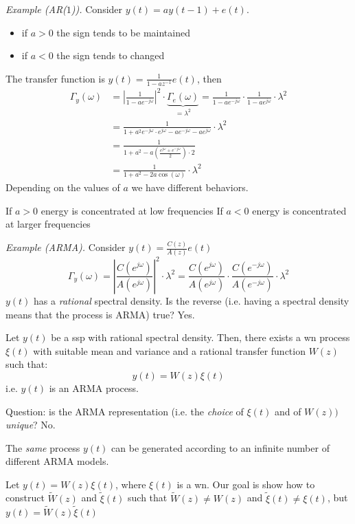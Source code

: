 \emph{Example (AR($1$)).}
Consider $y(t)=ay(t-1)+e(t)$.
\begin{itemize}
	\item if $a>0$ the sign tends to be maintained
	\item if $a<0$ the sign tends to changed
\end{itemize}
The transfer function is $y(t)=\frac{1}{1-az^{-1} }e(t)$, then
\begin{align*}
	\Gamma _{y}(\omega )&=\left|\frac{1}{1-ae^{-j\omega } }\right|^2 \cdot\underbrace{\Gamma _{e}(\omega )}_{=\lambda^2 } = \frac{1}{1-ae^{-j\omega}}\cdot\frac{1}{1-ae^{j\omega}} \cdot\lambda^2\\
	&=\frac{1}{1+a^2 e^{-j\omega }\cdot e^{j\omega }-ae^{-j\omega}-ae^{j\omega}} \cdot \lambda^2\\
	&=\frac{1}{1+a^2 -a\left( \frac{e^{j\omega}+e^{-j\omega}}{2} \right)\cdot 2}\\
	&=\frac{1}{1+a^2-2a\cos (\omega)} \cdot\lambda^2
\end{align*}
Depending on the values of $a$ we have different behaviors.

If $a>0$ energy is concentrated at low frequencies
If $a<0$ energy is concentrated at larger frequencies

\emph{Example (ARMA).}
Consider $y(t)=\frac{C(z)}{A(z)}e(t)$
\[
	\Gamma _{y}(\omega )=\left|\frac{C(e^{j\omega})}{A(e^{j\omega})}\right|^2 \cdot\lambda^2 =\frac{C(e^{j\omega})}{A(e^{j\omega} )} \cdot \frac{C(e^{-j\omega})}{A(e^{-j\omega} )}\cdot\lambda^2 
\]
$y(t)$ has a \emph{rational} spectral density. Is the reverse (i.e. having a spectral density means that the process is ARMA) true? Yes.

\begin{theorem}
	Let $y(t)$ be a \gls{ssp} with rational spectral density.
	Then, there exists a \gls{wn} process $\xi(t)$ with suitable mean and variance and a rational transfer function $W(z)$ such that:
	\[
		y(t)=W(z)\xi(t)
	\]
	i.e. $y(t)$ is an ARMA process.
\end{theorem}

Question: is the ARMA representation (i.e. the \emph{choice} of $\xi(t)$ and of $W(z))$ \emph{unique}? No.

The \emph{same} process $y(t)$ can be generated according to an infinite number of different ARMA models.

Let $y(t)=W(z)\xi(t)$, where $\xi(t)$ is a \gls{wn}. Our goal is show how to construct $\tilde{W}(z)$ and $\tilde{\xi}(t)$ such that $\tilde{W}(z)\neq W(z)$ and $\tilde{\xi}(t)\neq \xi(t)$, but $y(t)=\tilde W(z)\tilde\xi(t)$

